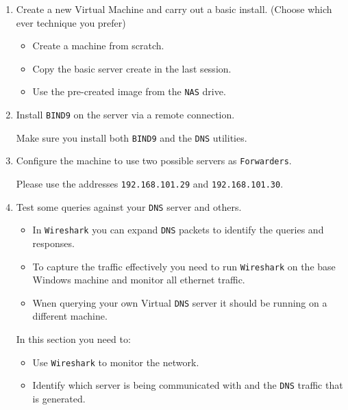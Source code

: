\documentclass[11pt]{article}
\begin{document}
\begin{enumerate}
    \item Create a new Virtual Machine and carry out a basic install. (Choose which ever technique you prefer)
        \begin{itemize}
            \item Create a machine from scratch.
            \item Copy the basic server create in the last session.
            \item Use the pre-created image from the \texttt{NAS} drive.
        \end{itemize}
    \item Install \texttt{BIND9} on the server via a remote connection. 
        \begin{tcolorbox}[title={\textbf{NOTE:}}]
            Make sure you install both \texttt{BIND9} and the \texttt{DNS} utilities. 
        \end{tcolorbox}
    \item Configure the machine to use two possible servers as \texttt{Forwarders}.
        \begin{tcolorbox}[title={\textbf{NOTE:}}]
            Please use the addresses \texttt{192.168.101.29} and \texttt{192.168.101.30}.
        \end{tcolorbox}
    \item Test some queries against your \texttt{DNS} server and others.
        \begin{tcolorbox}[title={\textbf{NOTE:}}]
            \begin{itemize}
                \item In \texttt{Wireshark} you can expand \texttt{DNS} packets to identify the queries and responses.
                \item To capture the traffic effectively you need to run \texttt{Wireshark} on the base Windows machine and monitor all ethernet traffic.
                \item Wnen querying your own Virtual \texttt{DNS} server it should be running on a different machine.
            \end{itemize}
        \end{tcolorbox}
        \begin{tcolorbox}[colback=blue!20]
            In this section you need to:
            \begin{itemize}
                \item Use \texttt{Wireshark} to monitor the network.
                \item Identify which server is being communicated with and the \texttt{DNS} traffic that is generated. 

\end{itemize}
\end{tcolorbox}
\end{enumerate}
\end{document}
